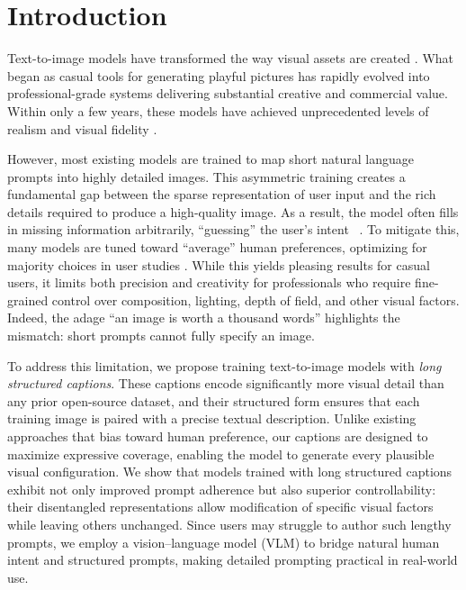 \section{Introduction}
\label{sec:intro}

Text-to-image models have transformed the way visual assets are created \cite{rombach2022high, saharia2022photorealistic, ramesh2022hierarchical}. What began as casual tools for generating playful pictures has rapidly evolved into professional-grade systems delivering substantial creative and commercial value. Within only a few years, these models have achieved unprecedented levels of realism and visual fidelity \cite{cai2025hidream, flux2024, esser2024scaling, wu2025qwenimagetechnicalreport}.


However, most existing models are trained to map short natural language prompts into highly detailed images. This asymmetric training creates a fundamental gap between the sparse representation of user input and the rich details required to produce a high-quality image. As a result, the model often fills in missing information arbitrarily, “guessing” the user’s intent ~\cite{orgad2023editing,wu2024stable,rassin2024grade, huberman2025image}. To mitigate this, many models are tuned toward “average” human preferences, optimizing for majority choices in user studies \cite{wallace2024diffusion, kirstain2023pick, liu2025improving}. While this yields pleasing results for casual users, it limits both precision and creativity for professionals who require fine-grained control over composition, lighting, depth of field, and other visual factors. Indeed, the adage “an image is worth a thousand words” highlights the mismatch: short prompts cannot fully specify an image.

To address this limitation, we propose training text-to-image models with \textit{long structured captions}. These captions encode significantly more visual detail than any prior open-source dataset, and their structured form ensures that each training image is paired with a precise textual description. 
Unlike existing approaches that bias toward human preference, our captions are designed to maximize expressive coverage, enabling the model to generate every plausible visual configuration. 
We show that models trained with long structured captions exhibit not only improved prompt adherence but also superior controllability: their disentangled representations allow modification of specific visual factors while leaving others unchanged. Since users may struggle to author such lengthy prompts, we employ a vision–language model (VLM) to bridge natural human intent and structured prompts, making detailed prompting practical in real-world use.



